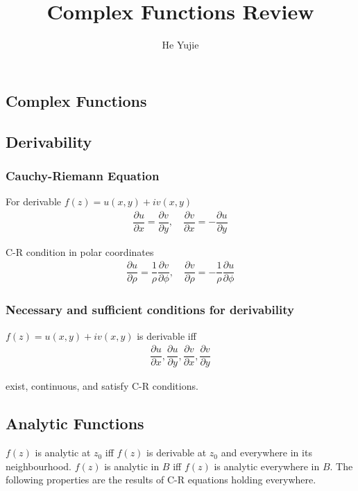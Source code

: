\documentclass[10pt, a4paper]{article}
\title{Complex Functions Review}
\author{He Yujie}
\def\D{\partial}
\begin{document}
\maketitle

\begin{multicols}{2}

\section{Complex Functions}
	
	\subsection{Derivability}
		
		\subsubsection{Cauchy-Riemann Equation}
			
			For derivable $f(z) = u(x,y) + iv(x,y)$
			\begin{align}
				\dfrac{\D u}{\D x} = \dfrac{\D v}{\D y},\quad
				\dfrac{\D v}{\D x} = - \dfrac{\D u}{\D y}
			\end{align}
			
			C-R condition in polar coordinates	
			\begin{align}
				\dfrac{\D u}{\D \rho} = \dfrac{1}{\rho} \dfrac{\D v}{\D \phi},\quad
				\dfrac{\D v}{\D \rho} = - \dfrac{1}{\rho} \dfrac{\D u}{\D \phi}
			\end{align}
		
		\subsubsection{Necessary and sufficient conditions for derivability}
			
			$f(z) = u(x,y) + iv(x,y)$ is derivable iff		
			\begin{align}
				\dfrac{\D u}{\D x}, \dfrac{\D u}{\D y}, \dfrac{\D v}{\D x}, \dfrac{\D v}{\D y}
			\end{align}
			
			exist, continuous, and satisfy C-R conditions.
		
	\subsection{Analytic Functions}
	
		$f(z)$ is analytic at $z_0$ iff $f(z)$ is derivable at $z_0$ and everywhere in its neighbourhood. $f(z)$ is analytic in $B$ iff $f(z)$ is analytic everywhere in $B$. The following properties are the results of C-R equations holding everywhere.
		

\end{multicols}
\end{document}

